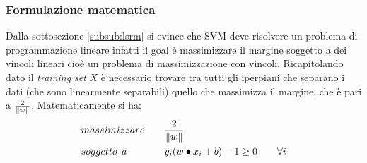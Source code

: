 \subsubsection{Formulazione matematica}
Dalla sottosezione \ref{subsub:lsrm} si evince che \ac{SVM} deve risolvere un problema di programmazione lineare infatti il goal è massimizzare il margine  soggetto a dei vincoli lineari cioè un problema di massimizzazione con vincoli. Ricapitolando dato il \textit{training set} $X$ è necessario trovare tra tutti gli iperpiani che separano i dati (che sono linearmente separabili) quello che massimizza il margine, che è pari a $\frac{2}{\lVert w\rVert}$.  Matematicamente si ha:
\begin{alignat*}{2}
&massimizzare \quad&&\frac{2}{\lVert w\rVert} \\
&soggetto \:\:a &&y_i(w \bullet x_i +b) - 1 \geq 0 \qquad \forall i
\end{alignat*} 

